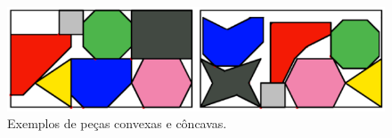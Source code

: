 \begin{figure}[H]
    \centering
    \caption{Exemplos de peças convexas e côncavas.}
    \label{fig:pieces-example}
    \includegraphics[scale=0.7]{utils/images/pieces-example}
\end{figure}
